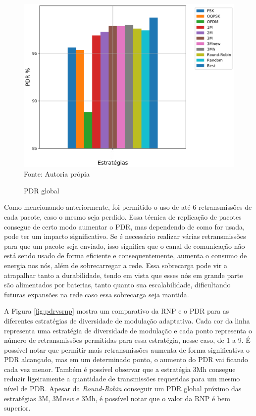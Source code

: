 \begin{figure}[H]
    \centering
    \caption{\footnotesize PDR global}
    \includegraphics[scale = 0.6]{sections/textual/Imagens/pdrglobal.png}\\
    Fonte: Autoria própia
    \label{fig:pdrglobal}
\end{figure}


\newpage

Como mencionando anteriormente, foi permitido o uso de até 6 retransmissões de cada pacote, caso o mesmo seja perdido. Essa técnica de replicação de pacotes consegue de certo modo aumentar o PDR, mas dependendo de como for usada, pode ter um impacto significativo. Se é necessário realizar várias retransmissões para que um pacote seja enviado, isso significa que o canal de comunicação não está sendo usado de forma eficiente e consequentemente, aumenta o consumo de energia nos nós, além de sobrecarregar a rede. Essa sobrecarga pode vir a atrapalhar tanto a durabilidade, tendo em vista que esses nós em grande parte são alimentados por baterias, tanto quanto sua escalabilidade, dificultando futuras expansões na rede caso essa sobrecarga seja mantida. 

A Figura \ref{fig:pdrvsrnp} mostra um comparativo da RNP e o PDR para as diferentes estratégias de diversidade de modulação adaptativa. Cada cor da linha representa uma estratégia de diversidade de modulação e cada ponto representa o número de retransmissões permitidas para essa estratégia, nesse caso, de 1 a 9. É possível notar que permitir mais retransmissões aumenta de forma significativa o PDR alcançado, mas em um determinado ponto, o aumento do PDR vai ficando cada vez menor. Também é possível observar que a estratégia 3Mh consegue reduzir ligeiramente a quantidade de transmissões requeridas para um mesmo nível de PDR. Apesar da \textit{Round-Robin} conseguir um PDR global próximo das estratégias 3M, 3M\textit{new} e 3Mh, é possível notar que o valor da RNP é bem superior. 

